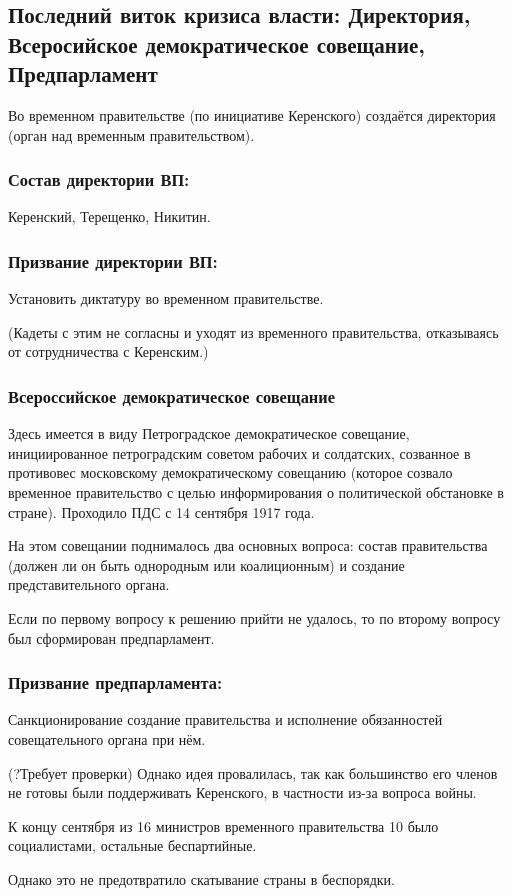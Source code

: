 \subsection{Последний виток кризиса власти: Директория, Всеросийское демократическое совещание, Предпарламент}

Во временном правительстве (по инициативе Керенского) создаётся директория (орган над временным правительством).

\subsubsection{\textbf{Состав директории ВП:}}

Керенский, Терещенко, Никитин.

\subsubsection{\textbf{Призвание директории ВП:}}

Установить диктатуру во временном правительстве.

(Кадеты с этим не согласны и уходят из временного правительства, отказываясь от сотрудничества с Керенским.)

\subsubsection{\textbf{Всероссийское демократическое совещание}}

Здесь имеется в виду Петроградское демократическое совещание, инициированное петроградским советом рабочих и солдатских, созванное в противовес московскому демократическому совещанию (которое созвало временное правительство с целью информирования о политической обстановке в стране). Проходило ПДС с 14 сентября 1917 года. 

На этом совещании поднималось два основных вопроса: состав правительства (должен ли он быть однородным или коалиционным) и создание представительного органа.

Если по первому вопросу к решению прийти не удалось, то по второму вопросу был сформирован предпарламент.

\subsubsection{\textbf{Призвание предпарламента:}}
 
Санкционирование создание правительства и исполнение обязанностей совещательного органа при нём.

(?Требует проверки) Однако идея провалилась, так как большинство его членов не готовы были поддерживать Керенского, в частности из-за вопроса войны.

К концу сентября из 16 министров временного правительства 10 было социалистами, остальные беспартийные.

Однако это не предотвратило скатывание страны в беспорядки.
